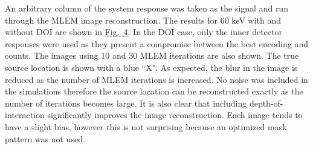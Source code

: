 \documentclass[10pt]{article}
\begin{document}
An arbitrary column of the system response was taken as the signal and run through the MLEM image reconstruction. The results for 60 keV with and without DOI are shown in \hyperlink{fig4}{Fig.~4}. In the DOI case, only the inner detector responses were used as they present a compromise between the best encoding and counts. The images using 10 and 30 MLEM iterations are also shown. The true source location is shown with a blue ``X". As expected, the blur in the image is reduced as the number of MLEM iterations is increased. No noise was included in the simulations therefore the source location can be reconstructed exactly as the number of iterations becomes large. It is also clear that including depth-of-interaction significantly improves the image reconstruction. Each image tends to have a slight bias, however this is not surprising because an optimized mask pattern was not used. 
\end{document}
